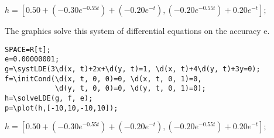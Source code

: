 {$h = [0. 50+(-0. 30 e^{-0. 55t})+(-0. 20 e^{-t}), (-0. 20 e^{-0. 55t})+0. 20 e^{-t}];$}

The graphics solve this system of differential equations on the accuracy e.

\begin{verbatim}
SPACE=R[t];
e=0.00000001;
g=\systLDE(3\d(x, t)+2x+\d(y, t)=1, \d(x, t)+4\d(y, t)+3y=0);
f=\initCond(\d(x, t, 0, 0)=0, \d(x, t, 0, 1)=0, 
            \d(y, t, 0, 0)=0, \d(y, t, 0, 1)=0);
h=\solveLDE(g, f, e); 
p=\plot(h,[-10,10,-10,10]); 
\end{verbatim}


{$h = [0. 50+(-0. 30 e^{-0. 55t})+(-0. 20 e^{-t}), (-0. 20 e^{-0. 55t})+0. 20 e^{-t}];$}

